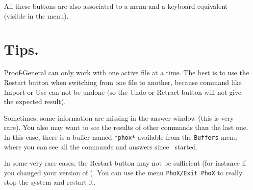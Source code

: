 All these buttons are also associated to a menu and a keyboard
equivalent (visible in the menu).

\section{Tips.}

Proof-General can only work with one active file at a time. The best
is to use the Restart button when switching from one file to another,
because command like Import or Use can not be undone (so the Undo
or Retract button will not give the expected result).

Sometimes, some information are missing in the answer window (this is
very rare). You also may want to see the results of other commands than
the last one. In this case, there is a buffer named \verb#*phox*#
available from the \verb#Buffers# menu where you can see all the
commands and answers since \AFD\ started.

In some very rare cases, the Restart button may not be sufficient (for
instance if you changed your version of \AFD). You
can use the menu \verb#PhoX/Exit PhoX# to really stop the system and
restart it.
